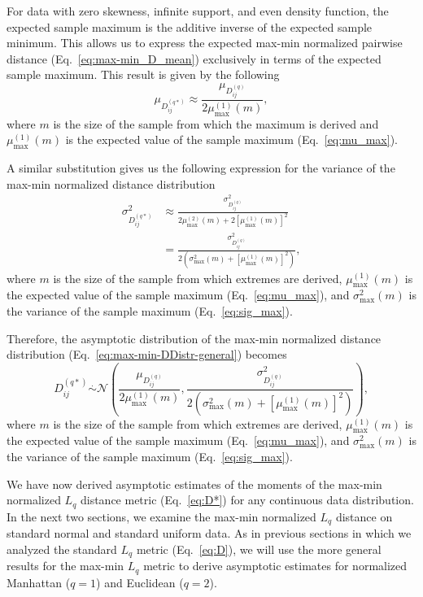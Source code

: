 \documentclass[10pt,letterpaper]{article}
\begin{document}
For data with zero skewness, infinite support, and even density function, the expected sample maximum is the additive inverse of the expected sample minimum. This allows us to express the expected max-min normalized pairwise distance (Eq.~\ref{eq:max-min_D_mean}) exclusively in terms of the expected sample maximum. This result is given by the following
%
\begin{equation}\label{eq:max-min_D_mean_symm}
\mu_{D^{(q*)}_{ij}} \approx \frac{\mu_{D^{(q)}_{ij}}}{2\mu^{(1)}_\text{max}(m)},
\end{equation}
%
where $m$ is the size of the sample from which the maximum is derived and $\mu^{(1)}_\text{max}(m)$ is the expected value of the sample maximum (Eq.~\ref{eq:mu_max}).

A similar substitution gives us the following expression for the variance of the max-min normalized distance distribution
%
\begin{equation}\label{eq:max-min_D_var_symm}
\begin{aligned}
\sigma^2_{D^{(q*)}_{ij}} &\approx \frac{\sigma^2_{D^{(q)}_{ij}}}{2\mu^{(2)}_\text{max}(m) + 2\left[\mu^{(1)}_\text{max}(m)\right]^2} \\
&= \frac{\sigma^2_{D^{(q)}_{ij}}}{2\left(\sigma^2_\text{max}(m) + \left[\mu^{(1)}_\text{max}(m)\right]^2\right)},
\end{aligned}
\end{equation}
%
where $m$ is the size of the sample from which extremes are derived, $\mu^{(1)}_\text{max}(m)$ is the expected value of the sample maximum (Eq.~\ref{eq:mu_max}), and $\sigma^2_\text{max}(m)$ is the variance of the sample maximum (Eq.~\ref{eq:sig_max}).

Therefore, the asymptotic distribution of the max-min normalized distance distribution (Eq.~\ref{eq:max-min-DDistr-general}) becomes
%
\begin{equation}\label{eq:max-min_DDistr}
D^{(q*)}_{ij} \overset{.}{\sim} \mathcal{N}\left(\frac{\mu_{D^{(q)}_{ij}}}{2\mu^{(1)}_\text{max}(m)}, \frac{\sigma^2_{D^{(q)}_{ij}}}{2\left(\sigma^2_\text{max}(m) + \left[\mu^{(1)}_\text{max}(m)\right]^2\right)}\right),
\end{equation}
%
where $m$ is the size of the sample from which extremes are derived, $\mu^{(1)}_\text{max}(m)$ is the expected value of the sample maximum (Eq.~\ref{eq:mu_max}), and $\sigma^2_\text{max}(m)$ is the variance of the sample maximum (Eq.~\ref{eq:sig_max}). 

We have now derived asymptotic estimates of the moments of the max-min normalized $L_q$ distance metric (Eq.~\ref{eq:D*}) for any continuous data distribution. In the next two sections, we examine the max-min normalized $L_q$ distance on standard normal and standard uniform data. As in previous sections in which we analyzed the standard $L_q$ metric (Eq.~\ref{eq:D}), we will use the more general results for the max-min $L_q$ metric to derive asymptotic estimates for normalized Manhattan ($q=1$) and Euclidean ($q=2$). 
\end{document}
